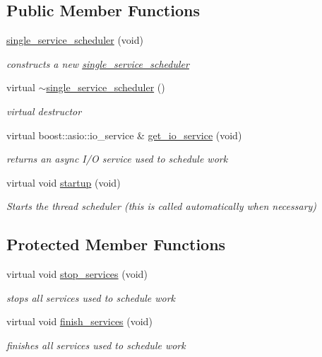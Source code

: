 \subsection*{Public Member Functions}
\begin{DoxyCompactItemize}
\item 
\hyperlink{classpion_1_1single__service__scheduler_a765e8e4dd3dc2f885dc0b1eb4009d3bd}{single\-\_\-service\-\_\-scheduler} (void)
\begin{DoxyCompactList}\small\item\em constructs a new \hyperlink{classpion_1_1single__service__scheduler}{single\-\_\-service\-\_\-scheduler} \end{DoxyCompactList}\item 
virtual \hyperlink{classpion_1_1single__service__scheduler_a5a8e8455c8442eeebef78b78f549047e}{$\sim$single\-\_\-service\-\_\-scheduler} ()
\begin{DoxyCompactList}\small\item\em virtual destructor \end{DoxyCompactList}\item 
virtual boost\-::asio\-::io\-\_\-service \& \hyperlink{classpion_1_1single__service__scheduler_a9afe2d43c1deb4f78dc4cfabd5f3a873}{get\-\_\-io\-\_\-service} (void)
\begin{DoxyCompactList}\small\item\em returns an async I/\-O service used to schedule work \end{DoxyCompactList}\item 
virtual void \hyperlink{classpion_1_1single__service__scheduler_a1f7e3583fb384e97eea9303201ae1631}{startup} (void)
\begin{DoxyCompactList}\small\item\em Starts the thread scheduler (this is called automatically when necessary) \end{DoxyCompactList}\end{DoxyCompactItemize}
\subsection*{Protected Member Functions}
\begin{DoxyCompactItemize}
\item 
virtual void \hyperlink{classpion_1_1single__service__scheduler_a954817cfba7dddde2abe96f6fbb5d1a8}{stop\-\_\-services} (void)
\begin{DoxyCompactList}\small\item\em stops all services used to schedule work \end{DoxyCompactList}\item 
virtual void \hyperlink{classpion_1_1single__service__scheduler_a87b3dd728dece02e378675d1536aea72}{finish\-\_\-services} (void)
\begin{DoxyCompactList}\small\item\em finishes all services used to schedule work \end{DoxyCompactList}\end{DoxyCompactItemize}
